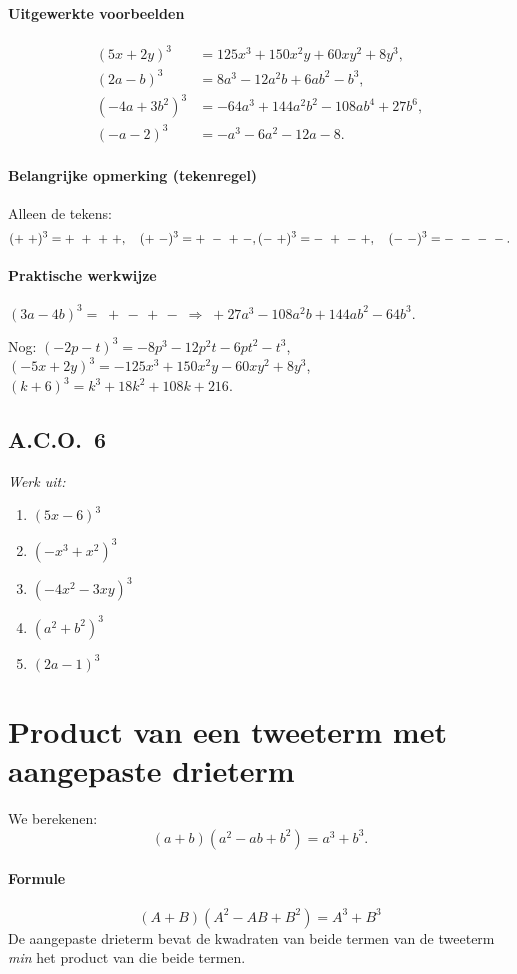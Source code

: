 \documentclass[a4paper,12pt]{article}
\begin{document}
\paragraph*{Uitgewerkte voorbeelden}
\[
\begin{aligned}
(5x+2y)^3&=125x^3+150x^2y+60xy^2+8y^3,\\
(2a-b)^3&=8a^3-12a^2b+6ab^2-b^3,\\
({-}4a+3b^2)^3&={-}64a^3+144a^2b^2-108ab^4+27b^6,\\
({-}a-2)^3&={-}a^3-6a^2-12a-8.
\end{aligned}
\]

\paragraph*{Belangrijke opmerking (tekenregel)}
Alleen de tekens:
\[
(+\ +)^3=+\ +\ +\ +,\quad (+\ -)^3=+\ -\ +\ -,\\
(-\ +)^3=-\ +\ -\ +,\quad (-\ -)^3=-\ -\ -\ -.
\]

\paragraph*{Praktische werkwijze}
\((3a-4b)^3=\;+\,-\,+\,-\;\Rightarrow\; +27a^3-108a^2b+144ab^2-64b^3.\)

Nog:
\(({-}2p-t)^3=-8p^3-12p^2t-6pt^2-t^3\), \quad
\(({-}5x+2y)^3={-}125x^3+150x^2y-60xy^2+8y^3\),\\
\((k+6)^3=k^3+18k^2+108k+216\).

\subsection*{A.C.O.\ 6}
\emph{Werk uit:}
\begin{enumerate}
  \item \((5x-6)^3\)
  \item \(({-}x^3+x^2)^3\)
  \item \(({-}4x^2-3xy)^3\)
  \item \((a^2+b^2)^3\)
  \item \((2a-1)^3\)
\end{enumerate}

\section{Product van een tweeterm met aangepaste drieterm}
We berekenen:
\[
(a+b)(a^2-ab+b^2)=a^3+b^3.
\]

\paragraph*{Formule}
\[
\boxed{(A+B)(A^2-AB+B^2)=A^3+B^3}
\]
De aangepaste drieterm bevat de kwadraten van beide termen van de tweeterm \emph{min} het product van die beide termen.
\end{document}
